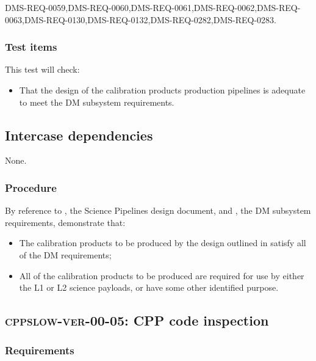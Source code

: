 \documentclass[DM,lsstdraft,STS,toc]{lsstdoc}
\begin{document}
DMS-REQ-0059,DMS-REQ-0060,DMS-REQ-0061,DMS-REQ-0062,DMS-REQ-0063,DMS-REQ-0130,DMS-REQ-0132,DMS-REQ-0282,DMS-REQ-0283.

\subsubsection{Test items}

This test will check:

\begin{itemize}

  \item{That the design of the calibration products production pipelines is
  adequate to meet the DM subsystem requirements.}

\end{itemize}

\subsection{Intercase dependencies}

None.

\subsubsection{Procedure}

By reference to , the Science Pipelines design document, and
, the DM subsystem requirements, demonstrate that:

\begin{itemize}

  \item{The calibration products to be produced by the design outlined in
   satisfy all of the DM requirements;}
  \item{All of the calibration products to be produced are required for use by
  either the L1 or L2 science payloads, or have some other identified
  purpose.}

\end{itemize}

\subsection{\textsc{cppslow-ver-00-05}: CPP code inspection}
\label{cppslow-ver-00-05}

\subsubsection{Requirements}
\end{document}
